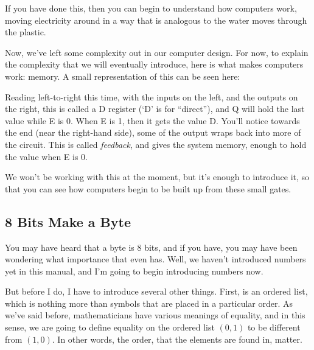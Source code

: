 If you have done this, then you can begin to understand how computers work, moving electricity around in a way that is analogous to the water moves through the plastic.

Now, we've left some complexity out in our computer design. For now, to explain the complexity that we will eventually introduce, here is what makes computers work: memory. A small representation of this can be seen here:

\begin{center}
\end{center}

Reading left-to-right this time, with the inputs on the left, and the outputs on the right, this is called a D register (`D' is for ``direct''), and Q will hold the last value while E is 0. When E is 1, then it gets the value D. You'll notice towards the end (near the right-hand side), some of the output wraps back into more of the circuit. This is called \emph{feedback}, and gives the system memory, enough to hold the value when E is 0.

We won't be working with this at the moment, but it's enough to introduce it, so that you can see how computers begin to be built up from these small gates.

\subsection{8 Bits Make a Byte}
You may have heard that a byte is 8 bits, and if you have, you may have been wondering what importance that even has. Well, we haven't introduced numbers yet in this manual, and I'm going to begin introducing numbers now.

But before I do, I have to introduce several other things. First, is an ordered list, which is nothing more than symbols that are placed in a particular order. As we've said before, mathematicians have various meanings of equality, and in this sense, we are going to define equality on the ordered list $(0, 1)$ to be different from $(1, 0)$. In other words, the order, that the elements are found in, matter.

